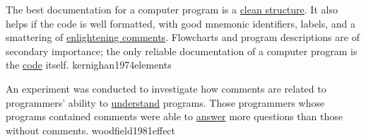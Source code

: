 \documentclass{article}
\begin{document}


  {The best documentation for a computer program is a \ul{clean structure}. It also helps if the code is well formatted, with good mnemonic identifiers, labels, and a smattering of \ul{enlightening comments}. Flowcharts and program descriptions are of secondary importance; the only reliable documentation of a computer program is the \ul{code} itself.}
  {kernighan1974elements}


  {An experiment was conducted to investigate how comments are related to programmers' ability to \ul{understand} programs. Those programmers whose programs contained comments were able to \ul{answer} more questions than those without comments.}
  {woodfield1981effect}
\end{document}
